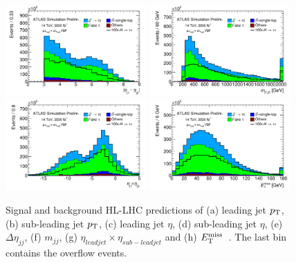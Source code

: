 \begin{figure}[!htpb]
  \includegraphics[width=0.48\textwidth]{figures/ATL-PHYS-PUB-2014-018/fig_03e}
  \includegraphics[width=0.48\textwidth]{figures/ATL-PHYS-PUB-2014-018/fig_03f}
  \includegraphics[width=0.48\textwidth]{figures/ATL-PHYS-PUB-2014-018/fig_03g}
  \includegraphics[width=0.48\textwidth]{figures/ATL-PHYS-PUB-2014-018/fig_03h}
  \caption{Signal and background HL-LHC predictions of (a) leading jet $p_{\mathrm{T}}$, (b) sub-leading jet $p_{\mathrm{T}}$, (c) leading jet $\eta$, (d) sub-leading jet $\eta$, (e) $\Delta\eta_{jj}$, (f) $m_{jj}$, (g) $\eta_{lead jet}\times \eta_{sub-lead jet}$ and (h) $E_{\mathrm{T}}^{\mathrm{miss}}$~\cite{ATL-PHYS-PUB-2014-018}. The last bin contains the overflow events.}
  \label{fig:prospects-hllhc-jets}
\end{figure}

